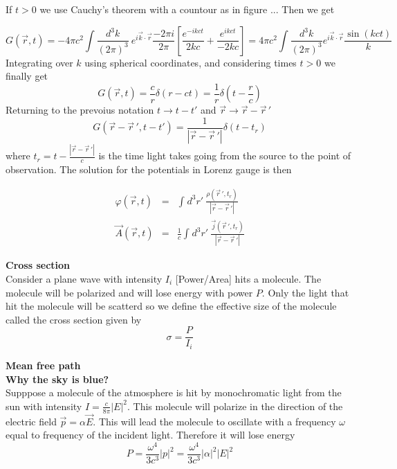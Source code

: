 \documentclass[12pt,a4paper]{article}
\newcommand{\integral}[3]{\int_{#1}^{#2} d #3 \ } %
\begin{document}
If $t>0$ we use Cauchy's theorem with a countour as in figure ...
Then we get

\begin{equation}
	G(\vec{r},t) = -4\pi c^2 \int \frac{d^3k} {(2\pi)^3}\ e^{i\vec{k}\cdot\vec{r}} \frac{-2\pi i}{2\pi}\left[\frac{e^{-ikct}}{2kc}+ \frac{e^{ikct}}{-2kc}\right] = 4\pi c^2 \int \frac{d^3k}{(2\pi)^3}e^{i\vec{k}\cdot \vec{r}}\frac{\sin (kct)}{k}
\end{equation}
Integrating over $k$ using spherical coordinates, and considering times $t>0$ we finally get
\begin{equation}
	G(\vec{r},t) = \frac{c}{r} \delta (r-ct) = \frac{1}{r} \delta (t-\frac{r}{c})
\end{equation}
Returning to the prevoius notation $t \to t-t'$ and $\vec{r}\to \vec{r} - \vec{r}\,'$
\begin{equation}
	G(\vec{r}-\vec{r}\,',t-t') = \frac{1}{|\vec{r}-\vec{r}\,'|} \delta (t-t_r)
\end{equation}
where $t_r = t-\frac{|\vec{r}-\vec{r}\,'|}{c}$ is the time light takes going from the source to the point of observation. The solution for the potentials in Lorenz gauge is then

\begin{eqnarray}
	\varphi(\vec{r},t) & = & \integral{}{}{^3r'} \frac{\rho (\vec{r}\,',t_r)}{|\vec{r} - \vec{r}\,'|} \\
	\vec{A}(\vec{r},t) & = &\frac{1}{c} \integral{}{}{^3r'} \frac{\vec{j} (\vec{r}\,',t_r)}{|\vec{r} - \vec{r}\,'|}
\end{eqnarray}

\textbf{Cross section}\\
Consider a plane wave with intensity $I_i$ [Power/Area] hits a molecule. The molecule will be polarized and will lose energy with power $P$. Only the light that hit the molecule will be scatterd so we define the effective size of the molecule called the cross section given by
\begin{equation}
	 \sigma = \frac{P}{I_i}
\end{equation}

\textbf{Mean free path}\\

\textbf{Why the sky is blue?}\\
Supppose a molecule of the atmosphere is hit by monochromatic light from the sun with intensity $I=\frac{c}{8\pi}|E|^2$. This molecule will polarize in the direction of the electric field $\vec{p}=\alpha \vec{E}$. This will lead the molecule to oscillate with a frequency $\omega$ equal to frequency of the incident light. Therefore it will lose energy
\begin{equation}
	P = \frac{\omega^4}{3c^3}|p|^2 = \frac{\omega^4}{3c^3} |\alpha|^2 |E|^2
\end{equation}
\end{document}
